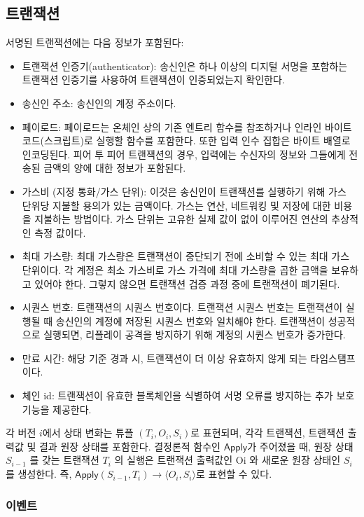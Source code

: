 \documentclass{article}
\begin{document}
\subsection{트랜잭션}

서명된 트랜잭션에는 다음 정보가 포함된다:
\begin{itemize}
    \item 트랜잭션 인증기(authenticator): 송신인은 하나 이상의 디지털 서명을 포함하는 트랜잭션 인증기를 사용하여 트랜잭션이 인증되었는지 확인한다.
    \item 송신인 주소: 송신인의 계정 주소이다.
    \item 페이로드: 페이로드는 온체인 상의 기존 엔트리 함수를 참조하거나 인라인 바이트 코드(스크립트)로 실행할 함수를 포함한다. 또한 입력 인수 집합은 바이트 배열로 인코딩된다. 피어 투 피어 트랜잭션의 경우, 입력에는 수신자의 정보와 그들에게 전송된 금액의 양에 대한 정보가 포함된다.
    \item 가스비 (지정 통화/가스 단위): 이것은 송신인이 트랜잭션를 실행하기 위해 가스 단위당 지불할 용의가 있는 금액이다. 가스는 연산, 네트워킹 및 저장에 대한 비용을 지불하는 방법이다. 가스 단위는 고유한 실제 값이 없이 이루어진 연산의 추상적인 측정 값이다.
    \item 최대 가스량: 최대 가스량은 트랜잭션이 중단되기 전에 소비할 수 있는 최대 가스 단위이다. 각 계정은 최소 가스비로 가스 가격에 최대 가스량을 곱한 금액을 보유하고 있어야 한다. 그렇지 않으면 트랜잭션 검증 과정 중에 트랜잭션이 폐기된다.
    \item 시퀀스 번호: 트랜잭션의 시퀀스 번호이다. 트랜잭션 시퀀스 번호는 트랜잭션이 실행될 때 송신인의 계정에 저장된 시퀀스 번호와 일치해야 한다. 트랜잭션이 성공적으로 실행되면, 리플레이 공격을 방지하기 위해 계정의 시퀀스 번호가 증가한다.
    \item 만료 시간: 해당 기준 경과 시, 트랜잭션이 더 이상 유효하지 않게 되는 타임스탬프이다.
    \item 체인 id: 트랜잭션이 유효한 블록체인을 식별하여 서명 오류를 방지하는 추가 보호 기능을 제공한다.
\end{itemize}
각 버전 $i$에서 상태 변화는 튜플 $(T_i, O_i, S_i)$로 표현되며, 각각 트랜잭션, 트랜잭션 출력값 및 결과 원장 상태를 포함한다. 결정론적 함수인 $\textsf{Apply}$가 주어졌을 때, 원장 상태 $S_{i-1}$ 를 갖는 트랜잭션  $T_i$ 의 실행은 트랜잭션 출력값인 Oi 와 새로운 원장 상태인 $S_i$를 생성한다. 즉,  $\textsf{Apply}(S_{i-1}, T_i) \rightarrow \langle O_i, S_i\rangle$로 표현할 수 있다.

\subsubsection{이벤트}
\label{subsub:events}
\end{document}

